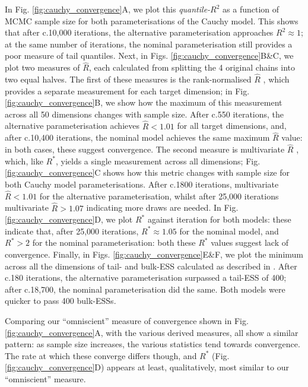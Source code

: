 \documentclass{article}
\begin{document}
In Fig. \ref{fig:cauchy_convergence}A, we plot this \textit{quantile-$R^2$} as a function of MCMC sample size for both parameterisations of the Cauchy model. This shows that after c.10,000 iterations, the alternative parameterisation approaches $R^2\approx 1$; at the same number of iterations, the nominal parameterisation still provides a poor measure of tail quantiles. Next, in Figs. \ref{fig:cauchy_convergence}B\&C, we plot two measures of $\widehat{R}$, each calculated from splitting the 4 original chains into two equal halves. The first of these measures is the rank-normalised $\widehat{R}$ \citep{vehtari2019rank}, which provides a separate measurement for each target dimension; in Fig. \ref{fig:cauchy_convergence}B, we show how the maximum of this measurement across all 50 dimensions changes with sample size. After c.550 iterations, the alternative parameterisation achieves $\widehat{R}<1.01$ for all target dimensions, and, after c.10,400 iterations, the nominal model achieves the same maximum $\widehat{R}$ value: in both cases, these suggest convergence. The second measure is multivariate $\widehat{R}$ \citep{brooks1998general}, which, like $R^*$, yields a single measurement across all dimensions; Fig. \ref{fig:cauchy_convergence}C shows how this metric changes with sample size for both Cauchy model parameterisations. After c.1800 iterations, multivariate $\widehat{R}<1.01$ for the alternative parameterisation, whilst after 25,000 iterations multivariate $\widehat{R}>1.07$ indicating more draws are needed. In Fig. \ref{fig:cauchy_convergence}D, we plot $R^*$ against iteration for both models: these indicate that, after 25,000 iterations, $R^*\approx 1.05$ for the nominal model, and $R^*>2$ for the nominal parameterisation: both these $R^*$ values suggest lack of convergence. Finally, in Figs. \ref{fig:cauchy_convergence}E\&F, we plot the minimum across all the dimensions of tail- and bulk-ESS calculated as described in \cite{vehtari2019rank}. After c.180 iterations, the alternative parameterisation surpassed a tail-ESS of 400; after c.18,700, the nominal parameterisation did the same. Both models were quicker to pass 400 bulk-ESSs.

Comparing our ``omniscient'' measure of convergence shown in Fig. \ref{fig:cauchy_convergence}A, with the various derived measures, all show a similar pattern: as sample size increases, the various statistics tend towards convergence. The rate at which these converge differs though, and $R^*$ (Fig. \ref{fig:cauchy_convergence}D) appears at least, qualitatively, most similar to our ``omniscient'' measure.
\end{document}
